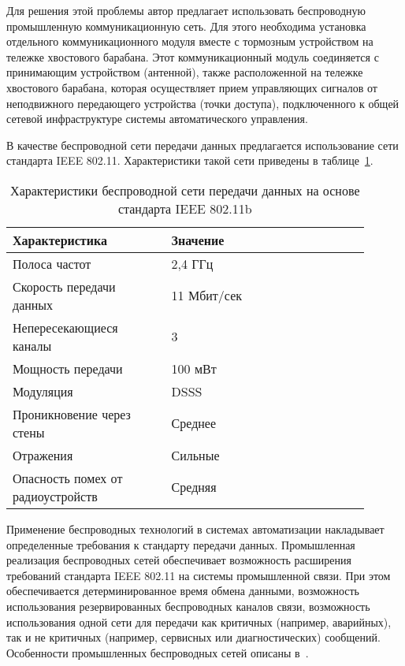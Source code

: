 Для решения этой проблемы автор предлагает использовать беспроводную промышленную коммуникационную сеть. Для этого необходима установка отдельного коммуникационного модуля вместе с тормозным устройством на тележке хвостового барабана. Этот коммуникационный модуль соединяется с принимающим устройством (антенной), также расположенной на тележке хвостового барабана, которая осуществляет прием управляющих сигналов от неподвижного передающего устройства (точки доступа), подключенного к общей сетевой инфраструктуре системы автоматического управления.

В качестве беспроводной сети передачи данных предлагается использование сети стандарта IEEE 802.11. Характеристики такой сети приведены в таблице~\ref{tabl.5:802.11b}. 

\begin{table}[h!]
\caption{Характеристики беспроводной сети передачи данных на основе стандарта IEEE 802.11b}
\label{tabl.5:802.11b}

\begin{center}
\begin{tabular}{|p{0.4\linewidth}|p{0.5\linewidth}|}
\hline
Характеристика                    & Значение     \\
\hline
Полоса частот                     & 2,4 ГГц      \\
\hline
Скорость передачи данных          & 11 Мбит/сек  \\
\hline
Непересекающиеся каналы           & 3            \\
\hline
Мощность передачи                 & 100 мВт      \\
\hline
Модуляция                         & DSSS         \\
\hline
Проникновение через стены         & Среднее      \\
\hline
Отражения                         & Сильные      \\
\hline
Опасность помех от радиоустройств & Средняя      \\
\hline
 
\end{tabular}
\end{center}
\end{table}

Применение беспроводных технологий в системах автоматизации накладывает определенные требования к стандарту передачи данных. Промышленная реализация беспроводных сетей обеспечивает возможность расширения требований стандарта IEEE 802.11 на системы промышленной связи. При этом обеспечивается детерминированное время обмена данными, возможность использования резервированных беспроводных каналов связи, возможность использования одной сети для передачи как критичных (например, аварийных), так и не критичных (например, сервисных или диагностических) сообщений. Особенности промышленных беспроводных сетей описаны в~\cite{siemens5}.

